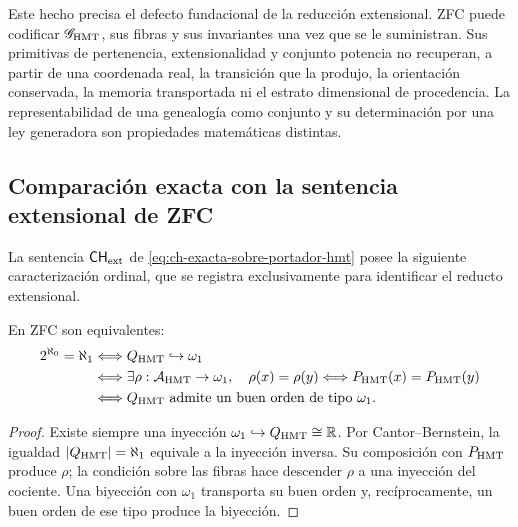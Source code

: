 Este hecho precisa el defecto fundacional de la reducci\'on extensional. ZFC
puede codificar \(\mathscr G_{\rm HMT}\), sus fibras y sus invariantes una
vez que se le suministran. Sus primitivas de pertenencia, extensionalidad y
conjunto potencia no recuperan, a partir de una coordenada real, la
transici\'on que la produjo, la orientaci\'on conservada, la memoria
transportada ni el estrato dimensional de procedencia. La representabilidad
de una genealog\'ia como conjunto y su determinaci\'on por una ley generadora
son propiedades matem\'aticas distintas.

\subsection{Comparaci\'on exacta con la sentencia extensional de ZFC}

La sentencia \(\mathsf{CH}_{\rm ext}\) de
\eqref{eq:ch-exacta-sobre-portador-hmt} posee la siguiente caracterizaci\'on
ordinal, que se registra exclusivamente para identificar el reducto
extensional.

\begin{theorem}
\label{thm:criterio-ordinal-ch}
En ZFC son equivalentes:
\begin{equation}
\begin{aligned}
2^{\aleph_0}=\aleph_1
&\Longleftrightarrow Q_{\rm HMT}\hookrightarrow\omega_1\\
&\Longleftrightarrow
\exists\rho:\mathcal A_{\rm HMT}\to\omega_1,\quad
\rho(x)=\rho(y)\Longleftrightarrow
P_{\rm HMT}(x)=P_{\rm HMT}(y)\\
&\Longleftrightarrow
Q_{\rm HMT}\text{ admite un buen orden de tipo }\omega_1.
\end{aligned}
\label{eq:classical-ch-equivalences}
\end{equation}
\end{theorem}

\begin{proof}
Existe siempre una inyecci\'on
\(\omega_1\hookrightarrow Q_{\rm HMT}\cong\mathbb R\). Por
Cantor--Bernstein, la igualdad \(|Q_{\rm HMT}|=\aleph_1\) equivale a la
inyecci\'on inversa. Su composici\'on con \(P_{\rm HMT}\) produce \(\rho\);
la condici\'on sobre las fibras hace descender \(\rho\) a una inyecci\'on del
cociente. Una biyecci\'on con \(\omega_1\) transporta su buen orden y,
rec\'iprocamente, un buen orden de ese tipo produce la biyecci\'on.
\end{proof}

